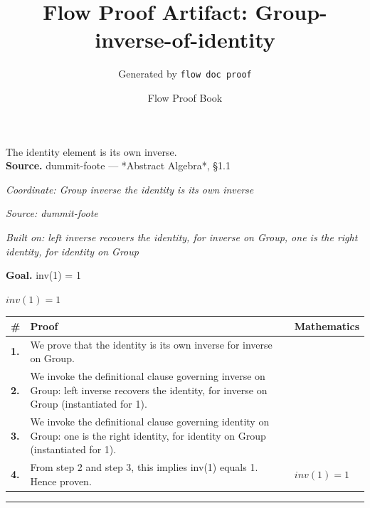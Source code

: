 \documentclass[11pt]{article}
\title{Flow Proof Artifact: Group-inverse-of-identity}
\author{Generated by \texttt{flow doc proof}}
\date{Flow Proof Book}
\theoremstyle{definition}
\begin{document}
\maketitle
The identity element is its own inverse.\\[0.5em]
\textbf{Source.} dummit-foote — *Abstract Algebra*, §1.1\\[0.5em]
\bigskip
{}\par
\smallskip\noindent\textit{Coordinate: Group \cdot inverse \cdot the identity is its own inverse}\par
\smallskip\noindent\textit{Source: dummit-foote}\par
\smallskip\noindent\textit{Built on: left inverse recovers the identity, for inverse on Group, one is the right identity, for identity on Group}\par
\medskip
\noindent\textbf{Goal.} inv(1) = 1\par
\noindent$\displaystyle inv(1) = 1$\par
\medskip
\noindent
\begin{tabular}{@{} >{\raggedright\arraybackslash}p{} >{\raggedright\arraybackslash}p{} >{\raggedleft\arraybackslash}p{} @{}}
\textbf{\#} & \textbf{Proof} & \textbf{Mathematics} \\
\midrule
\textbf{1.} & We prove that the identity is its own inverse for inverse on Group. & \\[0.45em]
\textbf{2.} & We invoke the definitional clause governing inverse on Group: left inverse recovers the identity, for inverse on Group (instantiated for 1). & \\[0.45em]
\textbf{3.} & We invoke the definitional clause governing identity on Group: one is the right identity, for identity on Group (instantiated for 1). & \\[0.45em]
\textbf{4.} & From step 2 and step 3, this implies inv(1) equals 1. Hence proven. & $\displaystyle inv(1) = 1$ \\[0.45em]
\bottomrule
\end{tabular}
\label{thm:Group-inverse-the_identity_is_its_own_inverse}
\par\medskip\hrule
\end{document}
